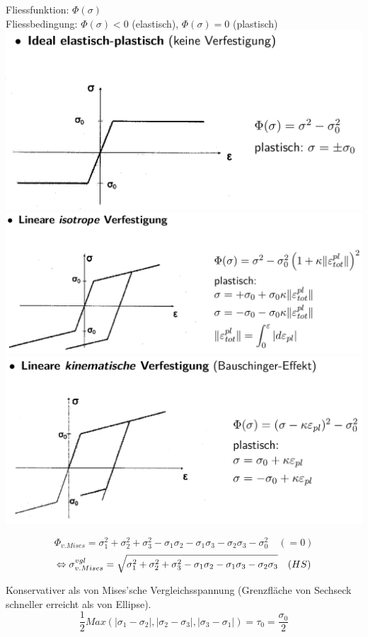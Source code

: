 \documentclass[a4paper,10pt]{article}
\begin{document}
\begin{multicols*}{3}
            Fliessfunktion: $\Phi(\sigma)$\\
            Fliessbedingung: $\Phi(\sigma)<0$ (elastisch), $\Phi(\sigma)=0$ (plastisch)
            \includegraphics[width=0.45\linewidth]{Verf_ideal_elpl}
            \includegraphics[width=0.5\linewidth]{Verf_lin_isotr}
            \includegraphics[width=0.5\linewidth]{Verf_lin_kin}
            
            \[\Phi_{v.Mises}= \sigma_1^2+\sigma_2^2+\sigma_3^2-\sigma_1\sigma_2-\sigma_1\sigma_3-\sigma_2\sigma_3 -\sigma_0^2\quad(=0)\]
            \[\Leftrightarrow \sigma_{v. Mises}^{vgl}= \sqrt{\sigma_1^2+\sigma_2^2+\sigma_3^2-\sigma_1\sigma_2-\sigma_1\sigma_3-\sigma_2\sigma_3} \quad\textrm(HS)\]
            
            Konservativer als von Mises'sche Vergleichsspannung (Grenzfläche von Sechseck schneller erreicht als von Ellipse).
            \[\frac{1}{2}Max(|\sigma_1-\sigma_2|,|\sigma_2-\sigma_3|,|\sigma_3-\sigma_1|)=\tau_0=\frac{\sigma_0}{2}\]

\end{multicols*}
\end{document}
